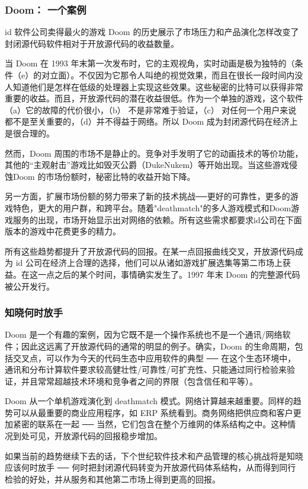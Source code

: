 \subsubsection{Doom： 一个案例}
id 软件公司卖得最火的游戏 Doom 的历史展示了市场压力和产品演化怎样改变了封闭源代码软件相对于开放源代码的收益数量。


当 Doom 在 1993 年末第一次发布时，它的主观视角，实时动画是极为独特的（条件（e）的对立面）。不仅因为它那令人叫绝的视觉效果，而且在很长一段时间内没人知道他们是怎样在低级的处理器上实现这些效果。这些秘密的比特可以获得非常重要的收益。而且，开放源代码的潜在收益很低。作为一个单独的游戏，这个软件（a）它的故障的代价很小，（b） 不是非常难于验证，（c） 对任何一个用户来说都不是至关重要的，（d）并不得益于网络。所以 Doom 成为封闭源代码在经济上是很合理的。


然而，Doom 周围的市场不是静止的。竞争对手发明了它的动画技术的等价功能，其他的“主观射击”游戏比如毁灭公爵（DukeNukem）等开始出现。当这些游戏侵蚀Doom 的市场份额时，秘密比特的收益开始下降。


另一方面，扩展市场份额的努力带来了新的技术挑战──更好的可靠性，更多的游戏特色，更大的用户群，和跨平台。随着"deathmatch"的多人游戏模式和Doom游戏服务的出现，市场开始显示出对网络的依赖。所有这些需求都要求id公司在下面版本的游戏中花费更多的精力。


所有这些趋势都提升了开放源代码的回报。在某一点回报曲线交叉，开放源代码成为 id 公司在经济上合理的选择，他们可以从诸如游戏扩展选集等第二市场上获益。在这一点之后的某个时间，事情确实发生了。1997 年末 Doom 的完整源代码被公开发行。

\subsubsection{知晓何时放手}
Doom 是一个有趣的案例，因为它既不是一个操作系统也不是一个通讯/网络软件；因此这远离了开放源代码的通常的明显的例子。确实，Doom 的生命周期，包括交叉点，可以作为今天的代码生态中应用软件的典型 ── 在这个生态环境中，通讯和分布计算软件要求较高健壮性/可靠性/可扩充性、只能通过同行检验来验证，并且常常超越技术环境和竞争者之间的界限（包含信任和平等）。


Doom 从一个单机游戏演化到 deathmatch 模式。网络计算越来越重要。同样的趋势可以从最重要的商业应用程序，如 ERP 系统看到。商务网络把供应商和客户更加紧密的联系在一起 ── 当然，它们包含在整个万维网的体系结构之中。这种情况到处可见，开放源代码的回报稳步增加。


如果当前的趋势继续下去的话，下个世纪软件技术和产品管理的核心挑战将是知晓应该何时放手 ── 何时把封闭源代码转变为开放源代码体系结构，从而得到同行检验的好处，并从服务和其他第二市场上得到更高的回报。


